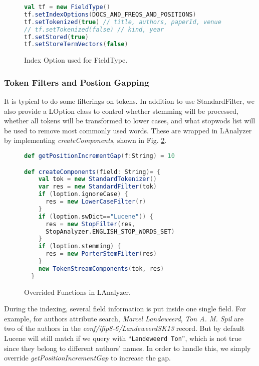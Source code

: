 \begin{figure}[t]
\begin{lstlisting}[language=scala]
val tf = new FieldType()
tf.setIndexOptions(DOCS_AND_FREQS_AND_POSITIONS)
tf.setTokenized(true) // title, authors, paperId, venue
// tf.setTokenized(false) // kind, year
tf.setStored(true)
tf.setStoreTermVectors(false)
\end{lstlisting}
\caption{Index Option used for FieldType.}\label{fig:indexOption}
\end{figure}

\subsubsection{Token Filters and Postion Gapping}
It is typical to do some filterings on tokens. In addition to use \textsf{StandardFilter}, we also provide a \textsf{LOption} class to control whether stemming will be processed, whether all tokens will be transformed to lower cases, and what stopwods list will be used to remove most commonly used words. These are wrapped in \textsf{LAnalyzer} by implementing \textit{createComponents}, shown in Fig. \ref{fig:createComponents}.
\begin{figure}[t]
\begin{lstlisting}[language=scala]
def getPositionIncrementGap(f:String) = 10

def createComponents(field: String)= {
    val tok = new StandardTokenizer()
    var res = new StandardFilter(tok)
    if (loption.ignoreCase) {
      res = new LowerCaseFilter(r)
    }
    if (loption.swDict=="Lucene")) {
      res = new StopFilter(res,
      StopAnalyzer.ENGLISH_STOP_WORDS_SET)
    }
    if (loption.stemming) {
      res = new PorterStemFilter(res)
    }
    new TokenStreamComponents(tok, res)
  }	
\end{lstlisting}
\caption{Overrided Functions in \textsf{LAnalyzer}.}\label{fig:createComponents}
\end{figure}

During the indexing, several field information is put inside one single \textsf{field}. For example, for \textsf{authors} attribute search, \textit{Marcel Landeweerd}, \textit{Ton A. M. Spil} are two of the authors in the \textit{conf/ifip8-6/LandeweerdSK13} record. But by default Lucene will still match if we query with ``\verb|Landeweerd Ton|'', which is not true since they belong to different authors' names. In order to handle this, we simply override \textit{getPositionIncrementGap} to increase the gap.


